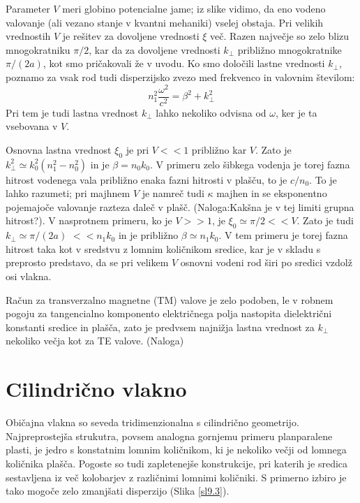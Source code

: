 \documentclass[11pt,fleqn]{book} %
\begin{document}
Parameter $V$ meri globino potencialne jame; iz slike vidimo, da
eno vodeno valovanje (ali vezano stanje v kvantni mehaniki) vselej
obstaja. Pri velikih vrednostih $V$ je rešitev za dovoljene vrednosti
$\xi$ več. Razen največje so zelo blizu mnogokratniku $\pi/2$, kar
da za dovoljene vrednosti $k_{\perp}$ približno mnogokratnike $\pi/(2a)$,
kot smo pričakovali že v uvodu. Ko smo določili lastne vrednosti $k_{\perp}$,
poznamo za vsak rod tudi disperzijsko zvezo med frekvenco in valovnim
številom: 
\begin{equation}
n_{1}^{2}\frac{\omega^{2}}{c^{2}}=\beta^{2}+k_{\perp}^{2}\label{9.10}
\end{equation}
 Pri tem je tudi lastna vrednost $k_{\perp}$ lahko nekoliko odvisna
od $\omega$, ker je ta vsebovana v $V$.

Osnovna lastna vrednost $\xi_{0}$ je pri $V<<1$ približno kar $V$.
Zato je $k_{\perp}^{2}\simeq k_{0}^{2}(n_{1}^{2}-n_{0}^{2})$ in je
$\beta=n_{0}k_{0}$. V primeru zelo šibkega vodenja je torej fazna
hitrost vodenega vala približno enaka fazni hitrosti v plašču, to
je $c/n_{0}$. To je lahko razumeti; pri majhnem $V$ je namreč tudi
$\kappa$ majhen in se eksponentno pojemajoče valovanje razteza daleč
v plašč. (Naloga:Kakšna je v tej limiti grupna hitrost?). V nasprotnem
primeru, ko je $V>>1$, je $\xi_{0}\simeq\pi/2<<V$. Zato je tudi
$k_{\perp}\simeq\pi/(2a)$ $<<n_{1}k_{0}$ in je približno $\beta\simeq n_{1}k_{0}$.
V tem primeru je torej fazna hitrost taka kot v sredstvu z lomnim
količnikom sredice, kar je v skladu s preprosto predstavo, da se pri
velikem $V$ osnovni vodeni rod širi po sredici vzdolž osi vlakna.

Račun za transverzalno magnetne (TM) valove je zelo podoben, le v
robnem pogoju za tangencialno komponento električnega polja nastopita
dielektrični konstanti sredice in plašča, zato je predvsem najnižja
lastna vrednost za $k_{\perp}$ nekoliko večja kot za TE valove. (Naloga)


\section{Cilindrično vlakno}

Običajna vlakna so seveda tridimenzionalna s cilindrično geometrijo.
Najpreprostejša strukutra, povsem analogna gornjemu primeru planparalene
plasti, je jedro s konstatnim lomnim količnikom, ki je nekoliko večji
od lomnega količnika plašča. Pogoste so tudi zapletenejše konstrukcije,
pri katerih je sredica sestavljena iz več kolobarjev z različnimi
lomnimi količniki. S primerno izbiro je tako mogoče zelo zmanjšati
disperzijo (Slika \ref{sl9.3}).
\end{document}
